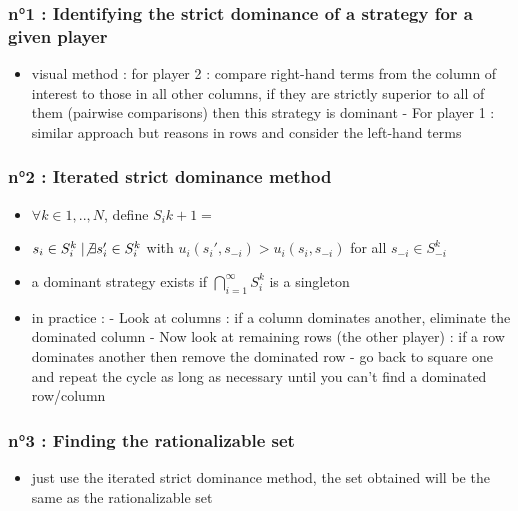 \documentclass{article}
\begin{document}
\subsubsection{n°1 : Identifying the strict dominance of a strategy for a given player}
\begin{itemize}
    \item visual method : for player 2 : compare right-hand terms from the column of interest to those in all other columns, if they are strictly superior to all of them (pairwise comparisons) then this strategy is dominant
        \subitem - For player 1 : similar approach but reasons in rows and consider the left-hand terms
\end{itemize}

\subsubsection{n°2 : Iterated strict dominance method}
\begin{itemize}
    \item $\forall k \in {1,..,N} $, define $S_i{k+1} = $
    \item $s_i \in S_i^k \mid \not\exists s_i' \in S_i^k$ with $ u_i(s_i', s_{-i}) > u_i(s_i, s_{-i}) $ for all $ s_{-i} \in S_{-i}^k$
    \item a dominant strategy exists if $\bigcap_{i=1}^\infty S_i^k $ is a singleton
    \item in practice : 
        \subitem - Look at columns : if a column dominates another, eliminate the dominated column
        \subitem - Now look at remaining rows (the other player) : if a row dominates another then remove the dominated row
        \subitem - go back to square one and repeat the cycle as long as necessary until you can't find a dominated row/column
\end{itemize}

\subsubsection{n°3 : Finding the rationalizable set}
\begin{itemize}
    \item just use the iterated strict dominance method, the set obtained will be the same as the rationalizable set 
\end{itemize}
\end{document}
